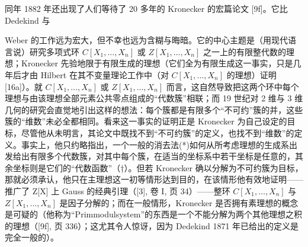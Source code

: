 同年 1882 年还出现了人们等待了 20 多年的 Kronecker 的宏篇论文 {[}9f{]}。它比 Dedekind 与

Weber 的工作远为宏大，但不幸也远为含糊与晦暗。它的中心主题是（用现代语言说）研究多项式环 \(C[X_{1},\ldots,X_{n}]\) 或 \(Z[X_{1},\ldots,X_{n}]\) 之一上的有限整代数的理想；Kronecker 先验地限于有限生成的理想（它们全为有限生成这一事实，只是几年后才由 Hilbert 在其不变量理论工作中（对 \(C[X_{1},\ldots,X_{n}]\) 的理想）证明{[}16a{]}）。就 \(C[X_{1},\ldots,X_{n}]\) 或 \(Z[X_{1},\ldots,X_{n}]\) 而言，这自然导致把这两个环中每个理想与由该理想全部元素公共零点组成的“代数簇”相联；而 19 世纪对 2 维与 3 维几何的研究会直觉地引出这样的想法：每个簇都是有限多个“不可约”簇的并，这些簇的“维数”未必全都相同。看来这一事实的证明正是 Kronecker 为自己设定的目标，尽管他从未明言，其论文中既找不到“不可约簇”的定义，也找不到“维数”的定义。事实上，他只约略指出，一个一般的消去法(*)如何从所考虑理想的生成系出发给出有限多个代数簇，对其中每个簇，在适当的坐标系中若干坐标是任意的，其余坐标则是它们的“代数函数”（†）。但若 Kronecker 确以分解为不可约簇为目标，那就必须承认，他只在主理想这一初等情形达到目的，在该情形他有效地证明——推广了 Z{[}X{]} 上 Gauss 的经典引理（{[}3{]}, 卷 I, 页 34）——整环 \(C[X_{1},\ldots,X_{n}]\) 与 \(Z[X_{1},\ldots,X_{n}]\) 是因子分解的；而在一般情形，Kronecker 是否拥有素理想的概念是可疑的（他称为“Primmodulsystem”的东西是一个不能分解为两个其他理想之积的理想（{[}9f{]}, 页 336）；这尤其令人惊讶，因为 Dedekind 1871 年已给出的定义是完全一般的）。

